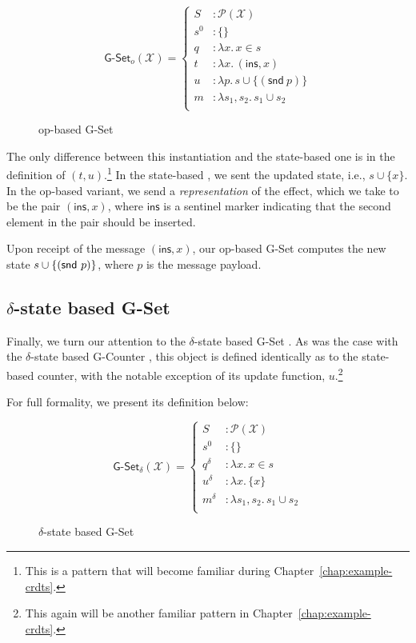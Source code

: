 \begin{figure}[H]
  \centering
  \[
    \textsf{G-Set}_o(\mathcal{X}) = \left\{\begin{aligned}
      S &: \mathcal{P}(\mathcal{X}) \\
      s^0 &: \{ \} \\
      q &: \lambda x.\, x \in s \\
      t &: \lambda x.\, (\textsf{ins}, x) \\
      u &: \lambda p.\, s \cup \{(\textsf{snd}~p)\} \\
      m &: \lambda s_1, s_2.\, s_1 \cup s_2 \\
    \end{aligned}\right.
  \]
  \caption{op-based \textsf{G-Set} \CRDT}
\end{figure}

The only difference between this \CRDT instantiation and the state-based one is
in the definition of $(t,u)$.\footnote{This is a pattern that will become
familiar during Chapter~\ref{chap:example-crdts}.} In the state-based \CRDT, we
sent the updated state, i.e., $s \cup \{ x \}$. In the op-based variant, we send
a \emph{representation} of the effect, which we take to be the pair
$(\textsf{ins}, x)$, where $\textsf{ins}$ is a sentinel marker indicating that
the second element in the pair should be inserted.

Upon receipt of the message $(\textsf{ins}, x)$, our op-based G-Set \CRDT
computes the new state $s \cup \{ (\textsf{snd}~p) \}$, where $p$ is the message
payload.

\subsection{$\delta$-state based G-Set}
Finally, we turn our attention to the $\delta$-state based G-Set \CRDT. As was
the case with the $\delta$-state based G-Counter \CRDT, this object is defined
identically as to the state-based counter, with the notable exception of its
update function, $u$.\footnote{This again will be another familiar pattern in
Chapter~\ref{chap:example-crdts}.}

For full formality, we present its definition below:

\begin{figure}[H]
  \centering
  \[
    \textsf{G-Set}_\delta(\mathcal{X}) = \left\{\begin{aligned}
      S &: \mathcal{P}(\mathcal{X}) \\
      s^0 &: \{ \} \\
      q^\delta &: \lambda x.\, x \in s \\
      u^\delta &: \lambda x.\, \{ x \} \\
      m^\delta &: \lambda s_1, s_2.\, s_1 \cup s_2 \\
    \end{aligned}\right.
  \]
  \caption{$\delta$-state based \textsf{G-Set} \CRDT}
\end{figure}

